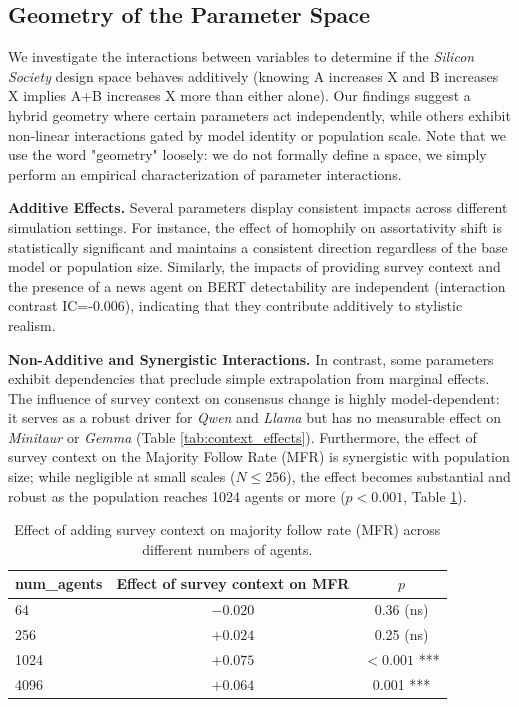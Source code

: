 \documentclass{article} %
\begin{document}
\subsection{Geometry of the Parameter Space}

\label{geometry_parameter_space}

We investigate the interactions between variables to determine if the \textit{Silicon Society} design space behaves additively (knowing A increases X and B increases X implies A+B increases X more than either alone). Our findings suggest a hybrid geometry where certain parameters act independently, while others exhibit non-linear interactions gated by model identity or population scale. Note that we use the word "geometry" loosely: we do not formally define a space, we simply perform an empirical characterization of parameter interactions.

\textbf{Additive Effects.} Several parameters display consistent impacts across different simulation settings. For instance, the effect of homophily on assortativity shift is statistically significant and maintains a consistent direction regardless of the base model or population size. Similarly, the impacts of providing survey context and the presence of a news agent on BERT detectability are independent (interaction contrast IC=-0.006), indicating that they contribute additively to stylistic realism.

\textbf{Non-Additive and Synergistic Interactions.} In contrast, some parameters exhibit dependencies that preclude simple extrapolation from marginal effects. The influence of survey context on consensus change is highly model-dependent: it serves as a robust driver for \textit{Qwen} and \textit{Llama} but has no measurable effect on \textit{Minitaur} or \textit{Gemma} (Table \ref{tab:context_effects}). Furthermore, the effect of survey context on the Majority Follow Rate (MFR) is synergistic with population size; while negligible at small scales ($N\leq256$), the effect becomes substantial and robust as the population reaches 1024 agents or more ($p<0.001$, Table \ref{tab:ctx_effect_mfr}).


\begin{table}[h]
\centering
\begin{tabular}{lcc}
\toprule
num\_agents & Effect of survey context on MFR & $p$ \\
\midrule
64    & $-0.020$ & 0.36 (ns) \\
256   & $+0.024$ & 0.25 (ns) \\
1024  & $+0.075$ & $< 0.001$ *** \\
4096  & $+0.064$ & 0.001 *** \\
\bottomrule
\end{tabular}
\caption{Effect of adding survey context on majority follow rate (MFR) across different numbers of agents.}
\label{tab:ctx_effect_mfr}
\end{table}
\end{document}
